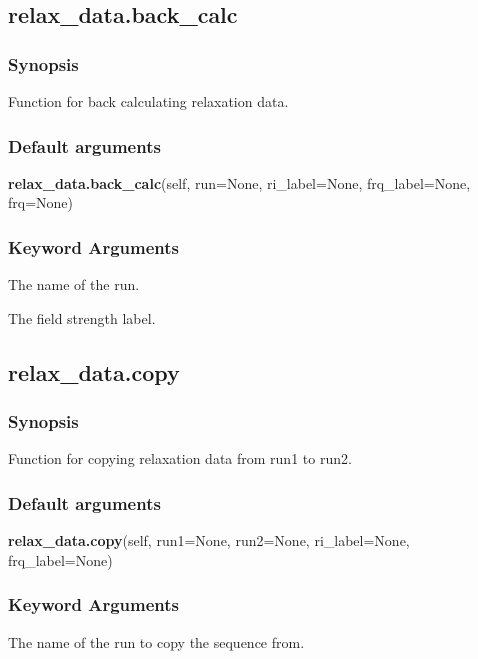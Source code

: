 \newpage

\subsection{relax\_data.back\_calc}


\subsubsection{Synopsis}

Function for back calculating relaxation data.

\subsubsection{Default arguments}

\textsf{\textbf{relax\_data.back\_calc}(self, run=None, ri\_label=None, frq\_label=None, frq=None)}


\subsubsection{Keyword Arguments}

  The name of the run.

  The field strength label.


\newpage

\subsection{relax\_data.copy}


\subsubsection{Synopsis}

Function for copying relaxation data from run1 to run2.

\subsubsection{Default arguments}

\textsf{\textbf{relax\_data.copy}(self, run1=None, run2=None, ri\_label=None, frq\_label=None)}


\subsubsection{Keyword Arguments}

  The name of the run to copy the sequence from.

